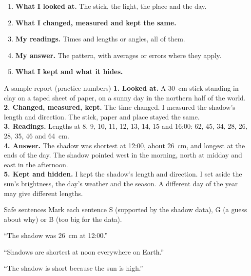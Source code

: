\begin{tcolorbox}[enhanced,colback=white,colframe=ink!60,boxrule=1pt,arc=2mm,left=8pt,right=8pt,top=5pt,bottom=5pt,before skip=7pt,after skip=7pt]
\sffamily\small
\begin{enumerate}[leftmargin=1.6em,itemsep=0.2em]
\item \textbf{What I looked at.} The stick, the light, the place and the day.
\item \textbf{What I changed, measured and kept the same.}
\item \textbf{My readings.} Times and lengths or angles, all of them.
\item \textbf{My answer.} The pattern, with averages or errors where they apply.
\item \textbf{What I kept and what it hides.}
\end{enumerate}
\end{tcolorbox}

\clearpage

\begin{worked}{A sample report (practice numbers)}
\textbf{1. Looked at.} A 30~cm stick standing in clay on a taped sheet of paper, on a sunny day in the northern half of the world.\\
\textbf{2. Changed, measured, kept.} The time changed. I measured the shadow's length and direction. The stick, paper and place stayed the same.\\
\textbf{3. Readings.} Lengths at 8, 9, 10, 11, 12, 13, 14, 15 and 16:00: 62, 45, 34, 28, 26, 28, 35, 46 and 64~cm.\\
\textbf{4. Answer.} The shadow was shortest at 12:00, about 26~cm, and longest at the ends of the day. The shadow pointed west in the morning, north at midday and east in the afternoon.\\
\textbf{5. Kept and hidden.} I kept the shadow's length and direction. I set aside the sun's brightness, the day's weather and the season. A different day of the year may give different lengths.
\end{worked}

\begin{puzzle}{Safe sentences}
Mark each sentence S (supported by the shadow data), G (a guess about why) or B (too big for the data).
\begin{description}[leftmargin=1.6em,itemsep=0.3em,style=sameline]
\item[(a)] ``The shadow was 26~cm at 12:00.'' \wline[1cm]
\item[(b)] ``Shadows are shortest at noon everywhere on Earth.'' \wline[1cm]
\item[(c)] ``The shadow is short because the sun is high.'' \wline[1cm]
\end{description}
\end{puzzle}

